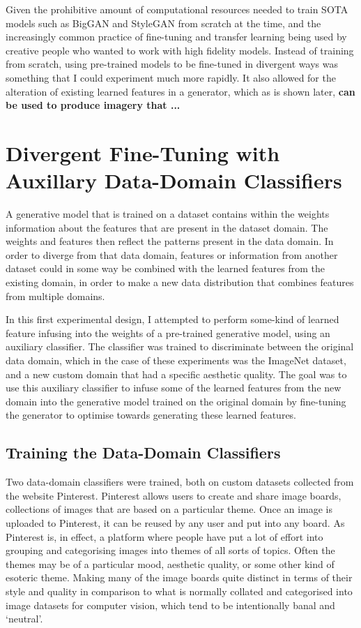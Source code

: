 Given the prohibitive amount of computational resources needed to train SOTA models such as BigGAN and StyleGAN from scratch at the time, and the increasingly common practice of fine-tuning and transfer learning being used by creative people who wanted to work with high fidelity models. 
Instead of training from scratch, using pre-trained models to be fine-tuned in divergent ways was something that I could experiment much more rapidly. 
It also allowed for the alteration of existing learned features in a generator, which as is shown later, \textbf{can be used to produce imagery that ...}

\section{Divergent Fine-Tuning with Auxillary Data-Domain Classifiers}
\label{c4:sec:first-exp}

A generative model that is trained on a dataset contains within the weights information about the features that are present in the dataset domain. 
The weights and features then reflect the patterns present in the data domain. 
In order to diverge from that data domain, features or information from another dataset could in some way be combined with the learned features from the existing domain, in order to make a new data distribution that combines features from multiple domains.

In this first experimental design, I attempted to perform some-kind of learned feature infusing into the weights of a pre-trained generative model, using an auxiliary classifier. 
The classifier was trained to discriminate between the original data domain, which in the case of these experiments was the ImageNet dataset, and a new custom domain that had a specific aesthetic quality. 
The goal was to use this auxiliary classifier to infuse some of the learned features from the new domain into the generative model trained on the original domain by fine-tuning the generator to optimise towards generating these learned features. 

\subsection{Training the Data-Domain Classifiers}

Two data-domain classifiers were trained, both on custom datasets collected from the website Pinterest. Pinterest allows users to create and share image boards, collections of images that are based on a particular theme. 
Once an image is uploaded to Pinterest, it can be reused by any user and put into any board. 
As Pinterest is, in effect, a platform where people have put a lot of effort into grouping and categorising images into themes of all sorts of topics. 
Often the themes may be of a particular mood, aesthetic quality, or some other kind of esoteric theme. 
Making many of the image boards quite distinct in terms of their style and quality in comparison to what is normally collated and categorised into image datasets for computer vision, which tend to be intentionally banal and `neutral’.

